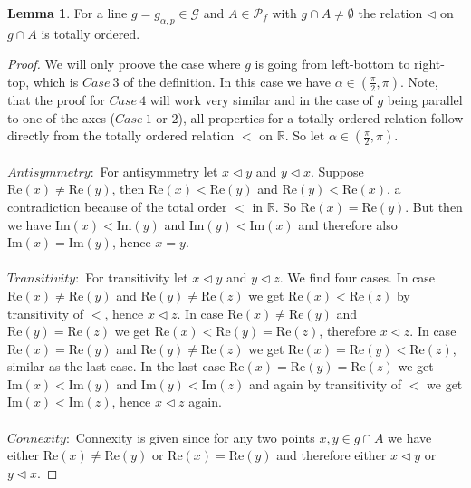 \documentclass[12pt,a4paper]{scrartcl}
\numberwithin{equation}{subsection}
\newcommand{\1}{\mathbbm{1}}
\newcommand{\G}{\mathcal{G}}
\newcommand{\mP}{\mathcal{P}}
\newcommand{\re}{\text{Re}}
\newcommand{\im}{\text{Im}}
\numberwithin{equation}{section}
\theoremstyle{definition}
\newtheorem{lemma}{Lemma}[subsection]
\begin{document}
\begin{lemma}
For a line $g=g_{\alpha,p}\in\G$ and $A\in \mP_f$ with $g\cap A\neq \emptyset$ the relation $\triangleleft$ on $g\cap A$ is totally ordered. 
	\begin{proof}
		We will only proove the case where $g$ is going from left-bottom to right-top, which is $\mathit{Case}\ 3$ of the definition. In this case we have $\alpha\in (\frac{\pi}{2},\pi)$. Note, that the proof for $\mathit{Case\ }4$ will work very similar and in the case of $g$ being parallel to one of the axes ($\mathit{Case\ }1$ or $2$), all properties for a totally ordered relation follow directly from the totally ordered relation $<$ on $\mathbb{R}$. So let $\alpha\in (\frac{\pi}{2},\pi)$. \\
		\\
		$\mathit{Antisymmetry:}$ For antisymmetry let $x \triangleleft y$ and $y \triangleleft x$. Suppose $\re(x)\neq \re(y)$, then $\re(x) < \re(y)$ and $\re(y) < \re(x)$, a contradiction because of the total order $<$ in $\mathbb{R}$. So $\re(x) = \re(y)$. But then we have $\im(x) < \im(y)$ and $\im(y) < \im(x)$ and therefore also $\im(x) = \im(y)$, hence $x=y$. \\
		\\
		$\mathit{Transitivity:}$ For transitivity let $x \triangleleft y$ and $y \triangleleft z$. We find four cases. In case $\re(x) \neq \re(y)$ and $\re(y) \neq \re(z)$ we get $\re(x) < \re(z)$ by transitivity of $<$, hence $x \triangleleft z$. In case $\re(x)\neq \re(y)$ and $\re(y) = \re(z)$ we get $\re(x) < \re(y) = \re(z)$, therefore $x \triangleleft z$. In case $\re(x) = \re(y)$ and $\re(y) \neq \re(z)$ we get $\re(x) = \re(y) < \re(z)$, similar as the last case. In the last case $\re(x) = \re(y) = \re(z)$ we get $\im(x) < \im(y)$ and $\im(y) < \im(z)$ and again by transitivity of $<$ we get $\im(x) < \im(z)$, hence $x \triangleleft z$ again. \\
		\\
		$\mathit{Connexity:}$ Connexity is given since for any two points $x,y\in g\cap A$ we have either $\re(x) \neq \re(y)$ or $\re(x) = \re(y)$ and therefore either $x\triangleleft y$ or $y\triangleleft x$.
	 
	\end{proof}
\end{lemma}
\end{document}

